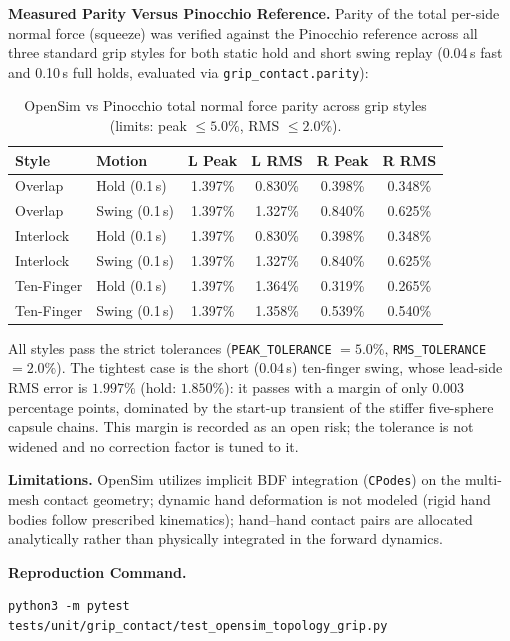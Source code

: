 \documentclass[11pt,a4paper]{article}
\begin{document}
\textbf{Measured Parity Versus Pinocchio Reference.} Parity of the total per-side normal force (squeeze) was verified
against the Pinocchio reference across all three standard grip styles for both static hold and short swing replay
(0.04\,s fast and 0.10\,s full holds, evaluated via \texttt{grip\_contact.parity}):
\begin{table}[htbp]
\centering
\small
\begin{tabular}{llcccc}
\toprule
\textbf{Style} & \textbf{Motion} & \textbf{L Peak} & \textbf{L RMS} & \textbf{R Peak} & \textbf{R RMS} \\
\midrule
Overlap & Hold (0.1\,s) & 1.397\% & 0.830\% & 0.398\% & 0.348\% \\
Overlap & Swing (0.1\,s) & 1.397\% & 1.327\% & 0.840\% & 0.625\% \\
Interlock & Hold (0.1\,s) & 1.397\% & 0.830\% & 0.398\% & 0.348\% \\
Interlock & Swing (0.1\,s) & 1.397\% & 1.327\% & 0.840\% & 0.625\% \\
Ten-Finger & Hold (0.1\,s) & 1.397\% & 1.364\% & 0.319\% & 0.265\% \\
Ten-Finger & Swing (0.1\,s) & 1.397\% & 1.358\% & 0.539\% & 0.540\% \\
\bottomrule
\end{tabular}
\caption{OpenSim vs Pinocchio total normal force parity across grip styles (limits: peak $\le 5.0\%$, RMS $\le 2.0\%$).}
\label{tab:osim_pin_parity}
\end{table}
All styles pass the strict tolerances (\texttt{PEAK\_TOLERANCE} $= 5.0\%$, \texttt{RMS\_TOLERANCE} $= 2.0\%$). The tightest case is the short (0.04\,s) ten-finger swing, whose lead-side RMS error is $1.997\%$ (hold: $1.850\%$): it passes with a margin of only $0.003$ percentage points, dominated by the start-up transient of the stiffer five-sphere capsule chains. This margin is recorded as an open risk; the tolerance is not widened and no correction factor is tuned to it.

\textbf{Limitations.} OpenSim utilizes implicit BDF integration (\texttt{CPodes}) on the multi-mesh contact geometry;
dynamic hand deformation is not modeled (rigid hand bodies follow prescribed kinematics); hand--hand contact pairs are
allocated analytically rather than physically integrated in the forward dynamics.

\textbf{Reproduction Command.}
\begin{verbatim}
python3 -m pytest tests/unit/grip_contact/test_opensim_topology_grip.py
\end{verbatim}
\end{document}
